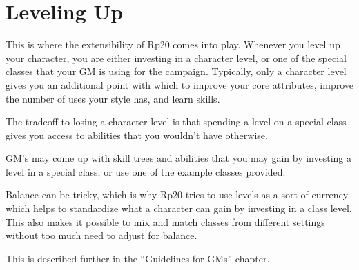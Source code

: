 \chapter{Leveling Up}
This is where the extensibility of Rp20 comes into play. Whenever you level up your character, you are either investing in a character level, or one of the special classes that your GM is using for the campaign. Typically, only a character level gives you an additional point with which to improve your core attributes, improve the number of uses your style has, and learn skills.

The tradeoff to losing a character level is that spending a level on a special class gives you access to abilities that you wouldn’t have otherwise.

GM’s may come up with skill trees and abilities that you may gain by investing a level in a special class, or use one of the example classes provided.

Balance can be tricky, which is why Rp20 tries to use levels as a sort of currency which helps to standardize what a character can gain by investing in a class level. This also makes it possible to mix and match classes from different settings without too much need to adjust for balance.

This is described further in the “Guidelines for GMs” chapter.

